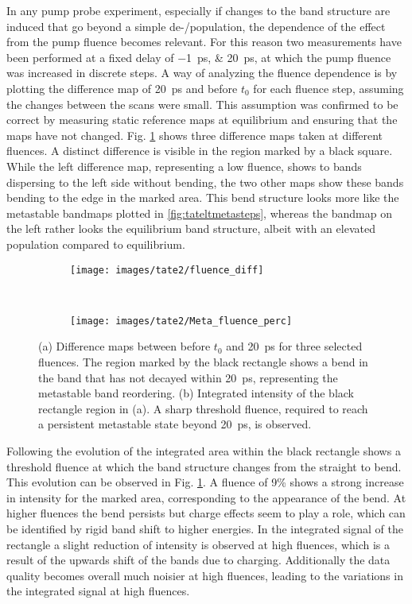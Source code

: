 In any pump probe experiment, especially if changes to the band structure are induced that go beyond a simple de-/population, the dependence of the effect from the pump fluence becomes relevant.
For this reason two measurements have been performed at a fixed delay of \qtylist{-1; 20}{\pico\second}, at which the pump fluence was increased in discrete steps.
A way of analyzing the fluence dependence is by plotting the difference map of \qty{20}{\pico\second} and before $t_0$ for each fluence step, assuming the changes between the scans were small.
This assumption was confirmed to be correct by measuring static reference maps at equilibrium and ensuring that the maps have not changed.
Fig. \ref{fig:tate_fluence} shows three difference maps taken at different fluences.
A distinct difference is visible in the region marked by a black square.
While the left difference map, representing a low fluence, shows to bands dispersing to the left side without bending, the two other maps show these bands bending to the edge in the marked area.
This bend structure looks more like the metastable bandmaps plotted in \ref{fig:tateltmetasteps}, whereas the bandmap on the left rather looks the equilibrium band structure, albeit with an elevated population compared to equilibrium.


\begin{figure}[t!]
	\centering
	\begin{subfigure}[b]{0.66\textwidth}
		\texttt{[image: images/tate2/fluence\_diff]}
		\caption{}
	\end{subfigure}
	\\
	\begin{subfigure}[b]{0.33\textwidth}
		\texttt{[image: images/tate2/Meta\_fluence\_perc]}
		\caption{}
	\end{subfigure}
	\caption{(a) Difference maps between before $t_0$ and \qty{20}{\pico\second} for three selected fluences. The region marked by the black rectangle shows a bend in the band that has not decayed within \qty{20}{\pico\second}, representing the metastable band reordering. (b) Integrated intensity of the black rectangle region in (a). A sharp threshold fluence, required to reach a persistent metastable state beyond \qty{20}{\pico\second}, is observed.}
	\label{fig:tate_fluence}
\end{figure}

Following the evolution of the integrated area within the black rectangle shows a threshold fluence at which the band structure changes from the straight to bend.
This evolution can be observed in Fig. \ref{fig:tate_fluence}.
A fluence of 9\% shows a strong increase in intensity for the marked area, corresponding to the appearance of the bend.
At higher fluences the bend persists but charge effects seem to play a role, which can be identified by rigid band shift to higher energies.
In the integrated signal of the rectangle a slight reduction of intensity is observed at high fluences, which is a result of the upwards shift of the bands due to charging.
Additionally the data quality becomes overall much noisier at high fluences, leading to the variations in the integrated signal at high fluences.

